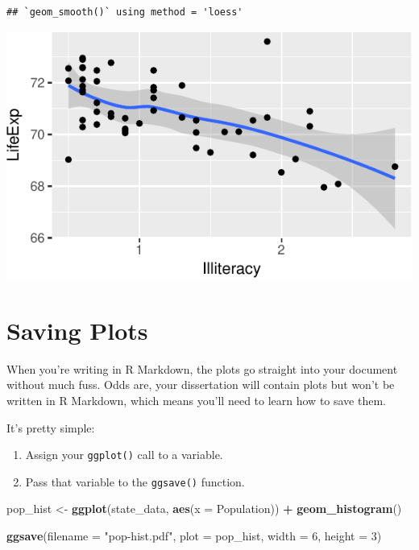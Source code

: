 \documentclass[12pt,oneside,openany]{book}
\newenvironment{Shaded}{\begin{snugshade}}{\end{snugshade}}
\newcommand{\KeywordTok}[1]{\textcolor[rgb]{0.13,0.29,0.53}{\textbf{#1}}}
\newcommand{\DataTypeTok}[1]{\textcolor[rgb]{0.13,0.29,0.53}{#1}}
\newcommand{\DecValTok}[1]{\textcolor[rgb]{0.00,0.00,0.81}{#1}}
\newcommand{\StringTok}[1]{\textcolor[rgb]{0.31,0.60,0.02}{#1}}
\newcommand{\OperatorTok}[1]{\textcolor[rgb]{0.81,0.36,0.00}{\textbf{#1}}}
\newcommand{\NormalTok}[1]{#1}
\providecommand{\tightlist}{%
  \setlength{\itemsep}{0pt}\setlength{\parskip}{0pt}}
\begin{document}
\begin{verbatim}
## `geom_smooth()` using method = 'loess'
\end{verbatim}

\includegraphics{pdaps_files/figure-latex/combine-1.pdf}

\section{Saving Plots}\label{saving-plots}

When you're writing in R Markdown, the plots go straight into your
document without much fuss. Odds are, your dissertation will contain
plots but won't be written in R Markdown, which means you'll need to
learn how to save them.

It's pretty simple:

\begin{enumerate}
\def\labelenumi{\arabic{enumi}.}
\tightlist
\item
  Assign your \texttt{ggplot()} call to a variable.
\item
  Pass that variable to the \texttt{ggsave()} function.
\end{enumerate}

\begin{Shaded}
\begin{Highlighting}[]
\NormalTok{pop_hist <-}\StringTok{ }\KeywordTok{ggplot}\NormalTok{(state_data, }\KeywordTok{aes}\NormalTok{(}\DataTypeTok{x =}\NormalTok{ Population)) }\OperatorTok{+}
\StringTok{  }\KeywordTok{geom_histogram}\NormalTok{()}

\KeywordTok{ggsave}\NormalTok{(}\DataTypeTok{filename =} \StringTok{"pop-hist.pdf"}\NormalTok{,}
       \DataTypeTok{plot =}\NormalTok{ pop_hist,}
       \DataTypeTok{width =} \DecValTok{6}\NormalTok{,}
       \DataTypeTok{height =} \DecValTok{3}\NormalTok{)}
\end{Highlighting}
\end{Shaded}
\end{document}
